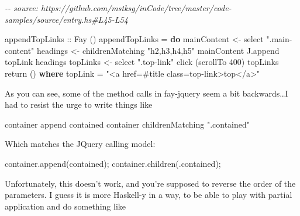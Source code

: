 \documentclass[]{article}
\newenvironment{Shaded}{}{}
\newcommand{\CommentTok}[1]{\textcolor[rgb]{0.38,0.63,0.69}{\textit{#1}}}
\newcommand{\DataTypeTok}[1]{\textcolor[rgb]{0.56,0.13,0.00}{#1}}
\newcommand{\DecValTok}[1]{\textcolor[rgb]{0.25,0.63,0.44}{#1}}
\newcommand{\FunctionTok}[1]{\textcolor[rgb]{0.02,0.16,0.49}{#1}}
\newcommand{\KeywordTok}[1]{\textcolor[rgb]{0.00,0.44,0.13}{\textbf{#1}}}
\newcommand{\NormalTok}[1]{#1}
\newcommand{\OperatorTok}[1]{\textcolor[rgb]{0.40,0.40,0.40}{#1}}
\newcommand{\OtherTok}[1]{\textcolor[rgb]{0.00,0.44,0.13}{#1}}
\newcommand{\StringTok}[1]{\textcolor[rgb]{0.25,0.44,0.63}{#1}}
\begin{document}
\begin{Shaded}
\begin{Highlighting}[]
\CommentTok{{-}{-} source: https://github.com/mstksg/inCode/tree/master/code{-}samples/source/entry.hs\#L45{-}L54}

\OtherTok{appendTopLinks ::} \DataTypeTok{Fay}\NormalTok{ ()}
\NormalTok{appendTopLinks }\OtherTok{=} \KeywordTok{do}
\NormalTok{  mainContent }\OtherTok{\textless{}{-}}\NormalTok{ select }\StringTok{".main{-}content"}
\NormalTok{  headings }\OtherTok{\textless{}{-}}\NormalTok{ childrenMatching }\StringTok{"h2,h3,h4,h5"}\NormalTok{ mainContent}
\NormalTok{  J.append topLink headings}
\NormalTok{  topLinks }\OtherTok{\textless{}{-}}\NormalTok{ select }\StringTok{".top{-}link"}
\NormalTok{  click (scrollTo }\DecValTok{400}\NormalTok{) topLinks}
  \FunctionTok{return}\NormalTok{ ()}
  \KeywordTok{where}
\NormalTok{    topLink }\OtherTok{=} \StringTok{"\textless{}a href=\textquotesingle{}\#title\textquotesingle{} class=\textquotesingle{}top{-}link\textquotesingle{}\textgreater{}top\textless{}/a\textgreater{}"}
\end{Highlighting}
\end{Shaded}

As you can see, some of the method calls in fay-jquery seem a bit
backwards\ldots I had to resist the urge to write things like

\begin{Shaded}
\begin{Highlighting}[]
\NormalTok{container }\OtherTok{\textasciigrave{}append\textasciigrave{}}\NormalTok{ contained}
\NormalTok{container }\OtherTok{\textasciigrave{}childrenMatching\textasciigrave{}} \StringTok{".contained"}
\end{Highlighting}
\end{Shaded}

Which matches the JQuery calling model:

\begin{Shaded}
\begin{Highlighting}[]
\NormalTok{container}\OperatorTok{.}\FunctionTok{append}\NormalTok{(contained)}\OperatorTok{;}
\NormalTok{container}\OperatorTok{.}\FunctionTok{children}\NormalTok{(}\StringTok{\textquotesingle{}.contained\textquotesingle{}}\NormalTok{)}\OperatorTok{;}
\end{Highlighting}
\end{Shaded}

Unfortunately, this doesn't work, and you're supposed to reverse the order of
the parameters. I guess it is more Haskell-y in a way, to be able to play with
partial application and do something like
\end{document}
